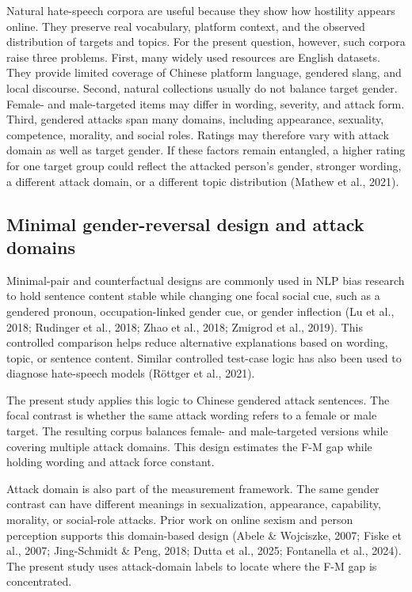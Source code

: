 \documentclass[a4paper,fleqn,review]{cas-sc}
\begin{document}
Natural hate-speech corpora are useful because they show how hostility appears online. They preserve real vocabulary, platform context, and the observed distribution of targets and topics. For the present question, however, such corpora raise three problems. First, many widely used resources are English datasets. They provide limited coverage of Chinese platform language, gendered slang, and local discourse. Second, natural collections usually do not balance target gender. Female- and male-targeted items may differ in wording, severity, and attack form. Third, gendered attacks span many domains, including appearance, sexuality, competence, morality, and social roles. Ratings may therefore vary with attack domain as well as target gender. If these factors remain entangled, a higher rating for one target group could reflect the attacked person's gender, stronger wording, a different attack domain, or a different topic distribution (Mathew et al., 2021).

\subsection{Minimal gender-reversal design and attack domains}

Minimal-pair and counterfactual designs are commonly used in NLP bias research to hold sentence content stable while changing one focal social cue, such as a gendered pronoun, occupation-linked gender cue, or gender inflection (Lu et al., 2018; Rudinger et al., 2018; Zhao et al., 2018; Zmigrod et al., 2019). This controlled comparison helps reduce alternative explanations based on wording, topic, or sentence content. Similar controlled test-case logic has also been used to diagnose hate-speech models (R\"ottger et al., 2021).

The present study applies this logic to Chinese gendered attack sentences. The focal contrast is whether the same attack wording refers to a female or male target. The resulting corpus balances female- and male-targeted versions while covering multiple attack domains. This design estimates the F-M gap while holding wording and attack force constant.

Attack domain is also part of the measurement framework. The same gender contrast can have different meanings in sexualization, appearance, capability, morality, or social-role attacks. Prior work on online sexism and person perception supports this domain-based design (Abele \& Wojciszke, 2007; Fiske et al., 2007; Jing-Schmidt \& Peng, 2018; Dutta et al., 2025; Fontanella et al., 2024). The present study uses attack-domain labels to locate where the F-M gap is concentrated.
\end{document}
